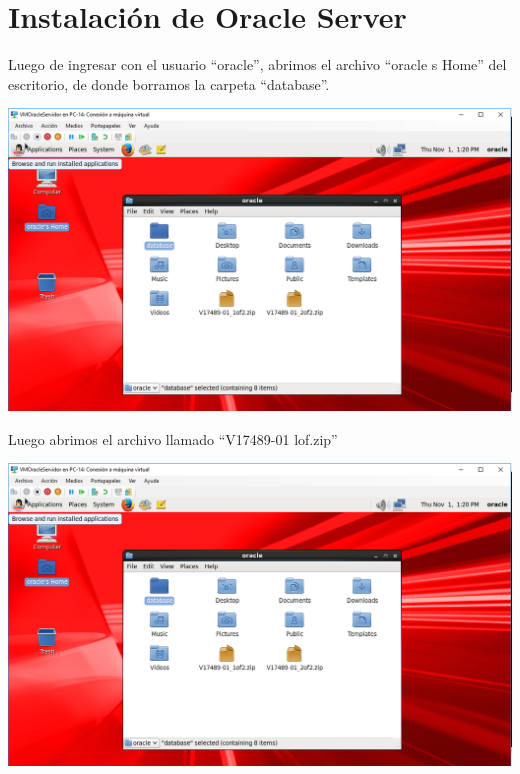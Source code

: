 \section{Instalación de Oracle Server} 
\vspace{\baselineskip}
Luego de ingresar con el usuario “oracle”, abrimos el archivo “oracle s Home” del escritorio, de donde borramos la carpeta “database”. 
\begin{center}
	\includegraphics[width=16cm]{./Imagenes/57} 
\end{center} 

\vspace{\baselineskip}

Luego abrimos el archivo llamado “V17489-01 lof.zip”
\begin{center}
	\includegraphics[width=16cm]{./Imagenes/58} 
\end{center} 

\vspace{\baselineskip}

